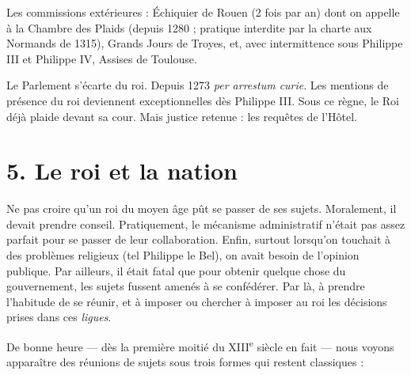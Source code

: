 \documentclass[french,twoside]{book} %
\newcommand{\labelchar}[1]{{\color{rubric}\bf #1}}
\newcommand\chapteropen{} %
\newcommand\chaptercont{} %
\newcommand\chapterclose{} %
\begin{document}
Les commissions extérieures : Échiquier de Rouen (2 fois par an) dont on appelle à la Chambre des Plaids (depuis 1280 ; pratique interdite par la charte aux Normands de 1315), Grands Jours de Troyes, et, avec intermittence sous Philippe III et Philippe IV, Assises de Toulouse.\par
Le Parlement s’écarte du roi. Depuis 1273 \emph{per arrestum curie}. Les mentions de présence du roi deviennent exceptionnelles dès Philippe III. Sous ce règne, le Roi déjà plaide devant sa cour. Mais justice retenue : les requêtes de l’Hôtel.
\chapterclose


\chapteropen
\chapter[5. Le roi et la nation]{\textsc{5. }Le roi et la nation}
\label{c05}

\chaptercont
\noindent \labelchar{1)}  
\label{p45} Ne pas croire qu’un roi du moyen âge pût se passer de ses sujets. Moralement, il devait prendre conseil. Pratiquement, le mécanisme administratif n’était pas assez parfait pour se passer de leur collaboration. Enfin, surtout lorsqu’on touchait à des problèmes religieux (tel Philippe le Bel), on avait besoin de l’opinion publique. Par ailleurs, il était fatal que pour obtenir quelque chose du gouvernement, les sujets fussent amenés à se confédérer. Par là, à prendre l’habitude de se réunir, et à imposer ou chercher à imposer au roi les décisions prises dans ces \emph{ligues}.\par
\bigbreak
\noindent \labelchar{2)} De bonne heure — dès la première moitié du XIII\textsuperscript{e} siècle en fait — nous voyons apparaître des réunions de sujets sous trois formes qui restent classiques :\par
\end{document}
